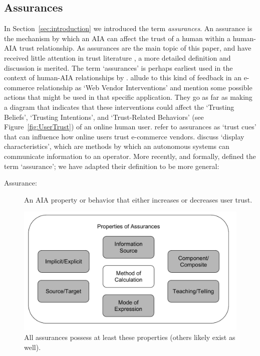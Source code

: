 \subsection{Assurances} \label{sec:assurances}
    In Section~\ref{sec:introduction} we introduced the term \emph{assurances}. An assurance is the mechanism by which an AIA can affect the trust of a human within a human-AIA trust relationship. As assurances are the main topic of this paper, and have received little attention in trust literature , a more detailed definition and discussion is merited. The term `assurances' is perhaps earliest used in the context of human-AIA relationships by \citet{Sheridan1984-kx}. \citet{McKnight2001-fa} allude to this kind of feedback in an e-commerce relationship as `Web Vendor Interventions' and mention some possible actions that might be used in that specific application. They go as far as making a diagram that indicates that these interventions could affect the `Trusting Beliefs', `Trusting Intentions', and `Trust-Related Behaviors' (see Figure~\ref{fig:UserTrust}) of an online human user. \citet{Corritore2003-gx} refer to assurances as `trust cues' that can influence how online users trust e-commerce vendors. \citet{Lee2004-pv} discuss `display characteristics', which are methods by which an autonomous systems can communicate information to an operator. More recently, and formally, \citet{Lillard2016-yg} defined the term `assurance'; we have adapted their definition to be more general:    
    \begin{description}
        \item [Assurance:] An AIA property or behavior that either increases or decreases user trust.
    \end{description}


    \begin{figure}[htpb]
        \centering
        \includegraphics[width=0.6\linewidth]{Figures/Assurance_properties.pdf}
        \caption{All assurances possess at least these properties (others likely exist as well).}
        \label{fig:assurance_classification}
    \end{figure}


